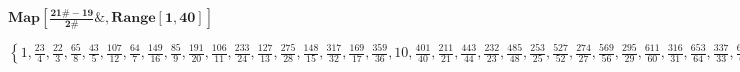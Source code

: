 \documentclass{article}
\begin{document}
\begin{doublespace}
\noindent\(\pmb{\text{Map}\left[\frac{21\#-19}{2\#}\&,\text{Range}[1,40]\right]}\)
\end{doublespace}

\begin{doublespace}
\noindent\(\left\{1,\frac{23}{4},\frac{22}{3},\frac{65}{8},\frac{43}{5},\frac{107}{12},\frac{64}{7},\frac{149}{16},\frac{85}{9},\frac{191}{20},\frac{106}{11},\frac{233}{24},\frac{127}{13},\frac{275}{28},\frac{148}{15},\frac{317}{32},\frac{169}{17},\frac{359}{36},10,\frac{401}{40},\frac{211}{21},\frac{443}{44},\frac{232}{23},\frac{485}{48},\frac{253}{25},\frac{527}{52},\frac{274}{27},\frac{569}{56},\frac{295}{29},\frac{611}{60},\frac{316}{31},\frac{653}{64},\frac{337}{33},\frac{695}{68},\frac{358}{35},\frac{737}{72},\frac{379}{37},\frac{41}{4},\frac{400}{39},\frac{821}{80}\right\}\)
\end{doublespace}
\end{document}
